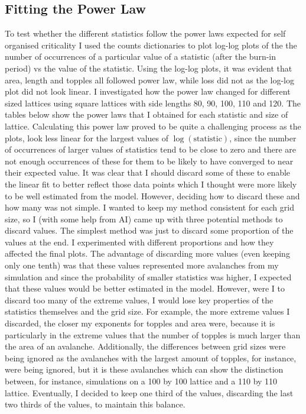 \documentclass{article}
\begin{document}
\subsection{Fitting the Power Law}
To test whether the different statistics follow the power laws expected for self organised criticality I used the counts dictionaries to plot log-log plots of the the number of occurrences of a particular value of a statistic (after the burn-in period) vs the value of the statistic. Using the log-log plots, it was evident that area, length and topples all followed power law, while loss did not as the log-log plot did not look linear.
\newline
I investigated how the power law changed for different sized lattices using square lattices with side lengths 80, 90, 100, 110 and 120. The tables below show the power laws that I obtained for each statistic and size of lattice. Calculating this power law proved to be quite a challenging process as the plots, look less linear for the largest values of $\log(\text{statistic})$, since the number of occurrences of larger values of statistics tend to be close to zero and there are not enough occurrences of these for them to be likely to have converged to near their expected value. It was clear that I should discard some of these to enable the linear fit to better reflect those data points which I thought were more likely to be well estimated from the model. However, deciding how to discard these and how many was not simple. I wanted to keep my method consistent for each grid size, so I (with some help from AI) came up with three potential methods to discard values.
\newline
The simplest method was just to discard some proportion of the values at the end. I experimented with different proportions and how they affected the final plots. The advantage of discarding more values (even keeping only one tenth) was that these values represented more avalanches from my simulation and since the probability of smaller statistics was higher, I expected that these values would be better estimated in the model. However, were I to discard too many of the extreme values, I would lose key properties of the statistics themselves and the grid size. For example, the more extreme values I discarded, the closer my exponents for topples and area were, because it is particularly in the extreme values that the number of topples is much larger than the area of an avalanche. Additionally, the differences between grid sizes were being ignored as the avalanches with the largest amount of topples, for instance, were being ignored, but it is these avalanches which can show the distinction between, for instance, simulations on a 100 by 100 lattice and a 110 by 110 lattice. Eventually, I decided to keep one third of the values, discarding the last two thirds of the values, to maintain this balance. 
\end{document}
